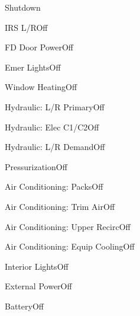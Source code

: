 \documentclass[sim-use, halfpage]{checklist}
\begin{document}
\begin{checklist}{Shutdown}
  \item{IRS L/R}{Off}
  \item{FD Door Power}{Off}
  \item{Emer Lights}{Off}
  \item{Window Heating}{Off}
  \item{Hydraulic: L/R Primary}{Off}
  \item{Hydraulic: Elec C1/C2}{Off}
  \item{Hydraulic: L/R Demand}{Off}
  \item{Pressurization}{Off}
  \item{Air Conditioning: Packs}{Off}
  \item{Air Conditioning: Trim Air}{Off}
  \item{Air Conditioning: Upper Recirc}{Off}
  \item{Air Conditioning: Equip Cooling}{Off}
  \item{Interior Lights}{Off}
  \item{External Power}{Off}
  \item{Battery}{Off}
\end{checklist}
\end{document}
